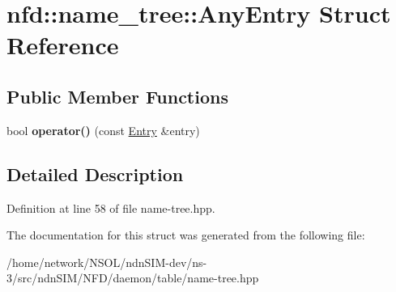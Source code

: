 \hypertarget{structnfd_1_1name__tree_1_1AnyEntry}{}\section{nfd\+:\+:name\+\_\+tree\+:\+:Any\+Entry Struct Reference}
\label{structnfd_1_1name__tree_1_1AnyEntry}
\subsection*{Public Member Functions}
\begin{DoxyCompactItemize}
\item 
bool {\bfseries operator()} (const \hyperlink{classnfd_1_1name__tree_1_1Entry}{Entry} \&entry)\hypertarget{structnfd_1_1name__tree_1_1AnyEntry_ac6dfa2ffb2523365ef9f77f8b259e28a}{}\label{structnfd_1_1name__tree_1_1AnyEntry_ac6dfa2ffb2523365ef9f77f8b259e28a}

\end{DoxyCompactItemize}


\subsection{Detailed Description}


Definition at line 58 of file name-\/tree.\+hpp.



The documentation for this struct was generated from the following file\+:\begin{DoxyCompactItemize}
\item 
/home/network/\+N\+S\+O\+L/ndn\+S\+I\+M-\/dev/ns-\/3/src/ndn\+S\+I\+M/\+N\+F\+D/daemon/table/name-\/tree.\+hpp\end{DoxyCompactItemize}

